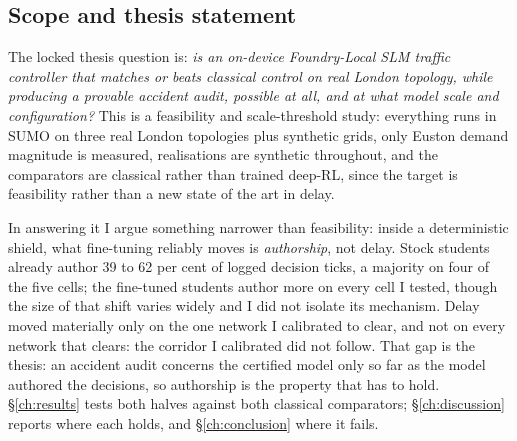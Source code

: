 \subsection{Scope and thesis statement}\label{sec:intro-scope}
The locked thesis question is: \emph{is an on-device Foundry-Local SLM
traffic controller that matches or beats classical control on real London
topology, while producing a provable accident audit, possible at all, and
at what model scale and configuration?} This is a feasibility and
scale-threshold study: everything runs in SUMO on three real London
topologies plus synthetic grids, only Euston demand magnitude is measured,
realisations are synthetic throughout, and the comparators are classical
rather than trained deep-RL, since the target is feasibility rather than a
new state of the art in delay.

In answering it I argue something narrower than feasibility: inside a
deterministic shield, what fine-tuning reliably moves is
\emph{authorship}, not delay. Stock students already author 39 to 62 per
cent of logged decision ticks, a majority on four of the five cells; the
fine-tuned students author more on every cell I tested, though the size of
that shift varies widely and I did not isolate its mechanism. Delay moved
materially only on the one network I calibrated to clear, and not on every
network that clears: the corridor I calibrated did not follow. That gap is
the thesis: an accident audit concerns the certified model only so far as
the model authored the decisions, so authorship is the property that has
to hold. \S\ref{ch:results} tests both halves against both classical
comparators; \S\ref{ch:discussion} reports where each holds, and
\S\ref{ch:conclusion} where it fails.

